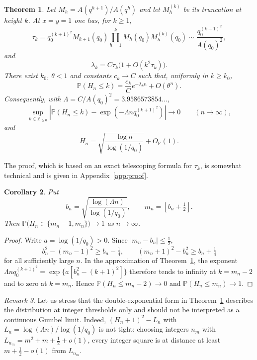 \documentclass[11pt,reqno]{amsart}
\numberwithin{equation}{section}
\newtheorem{theorem}{Theorem}[section]
\newtheorem{corollary}[theorem]{Corollary}
\theoremstyle{remark}
\newtheorem{remark}[theorem]{Remark}
\begin{document}
\begin{theorem}\label{thm:height}
Let $M_h=A(q^{h+1})/A(q^h)$ and let $M^{(k)}_h$ be its truncation at height $k$. At
$x=y=1$ one has, for $k\ge1$,
\begin{equation}\label{eq:tau}
\tau_k=q_0^{(k+1)^2}M_{k+1}(q_0)
\prod_{h=1}^{k}M_h(q_0)M^{(k)}_h(q_0)
\sim\frac{q_0^{(k+1)^2}}{A(q_0)^2},
\end{equation}
and
\[
\lambda_k=C\tau_k\bigl(1+O(k^2\tau_k)\bigr).
\]
There exist $k_0$, $\theta<1$ and constants $c_k\to C$ such that, uniformly in $k\ge k_0$,
\[
\mathbb P(H_n\le k)=\frac{c_k}{C}e^{-\lambda_kn}+O(\theta^n).
\]
Consequently, with $\Lambda=C/A(q_0)^2=3.9586573854\ldots$,
\[
\sup_{k\in\mathbb Z_{\ge0}}
\left|\mathbb P(H_n\le k)-\exp\!\left(-\Lambda n q_0^{(k+1)^2}\right)\right|
\longrightarrow0\qquad(n\to\infty),
\]
and
\[
H_n=\sqrt{\frac{\log n}{\log(1/q_0)}}+O_{\mathbb P}(1).
\]
\end{theorem}

The proof, which is based on an exact telescoping formula for $\tau_k$, is somewhat
technical and is given in Appendix~\ref{app:proof}.

\begin{corollary}\label{cor:two-heights}
Put
\[
b_n=\sqrt{\frac{\log(\Lambda n)}{\log(1/q_0)}},\qquad
m_n=\left\lfloor b_n+\tfrac12\right\rfloor.
\]
Then $\mathbb P\bigl(H_n\in\{m_n-1,m_n\}\bigr)\to1$ as $n\to\infty$.
\end{corollary}

\begin{proof}
Write $a=\log(1/q_0)>0$. Since $|m_n-b_n|\le\tfrac12$,
\[
b_n^2-(m_n-1)^2\ge b_n-\tfrac14,\qquad
(m_n+1)^2-b_n^2\ge b_n+\tfrac14
\]
for all sufficiently large $n$. In the approximation of Theorem~\ref{thm:height},
the exponent $\Lambda n q_0^{(k+1)^2}=\exp\{a[b_n^2-(k+1)^2]\}$ therefore tends
to infinity at $k=m_n-2$ and to zero at $k=m_n$. Hence
$\mathbb P(H_n\le m_n-2)\to0$ and $\mathbb P(H_n\le m_n)\to1$.
\end{proof}

\begin{remark}
Let us stress that the double-exponential form in Theorem~\ref{thm:height} describes the
distribution at integer thresholds only and should not be interpreted as a continuous
Gumbel limit. Indeed, $(H_n+1)^2-L_n$ with $L_n=\log(\Lambda n)/\log(1/q_0)$ is not
tight: choosing integers $n_m$ with $L_{n_m}=m^2+m+\tfrac12+o(1)$, every integer square
is at distance at least $m+\tfrac12-o(1)$ from $L_{n_m}$.
\end{remark}
\end{document}
